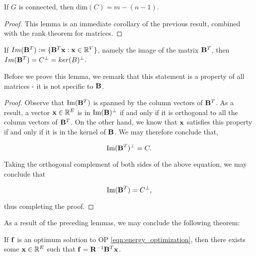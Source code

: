 \documentclass[11pt]{article}
\begin{document}
\begin{lemma}

If $G$ is connected, then $\text{dim}(C)= m -(n-1)$.

\end{lemma}

\begin{proof}

This lemma is an immediate corollary of the previous result, combined with the rank theorem
for matrices.

\end{proof}

\begin{lemma}

If $Im(\V{B}^{T}):=\{ \V{B}^{T}\V{x}: \V{x} \in \rea^{V}\}$, namely the image of the matrix $\V{B}^{T}$,
then $Im(\V{B}^{T})=C^{\perp}=ker(B)^{\perp}$.


\end{lemma}

Before we prove this lemma, we remark that this statement is a property of all matrices - it is not
specific to $\V{B}$.

\begin{proof}


Observe that $\text{Im}(\V{B}^{T})$ is spanned by the column vectors
of $\V{B}^{T}$. As a result, a vector $\V{x} \in \rea^{E}$ is in $\text{Im}(\V{B})^{\perp}$
if and only if it is orthogonal to all the column vectors of $\V{B}^{T}$. On the other hand,
we know that $\V{x}$ satisfies this property if and only if
it is in the kernel of $\V{B}$. We may therefore conclude that,

\[
 	\text{Im}(\V{B}^{T})^{\perp} = C.
\]

Taking the orthogonal complement of both sides of the above equation, we may conclude that

\[
	\text{Im}(\V{B}^{T}) = C^{\perp},
\]

thus completing the proof.


\end{proof}

As a result of the preceding lemmas, we may conclude the following theorem:

\begin{theorem}\label{thm:energy_characterization}

If $\V{f}$ is an optimum solution to OP \ref{eqn:energy_optimization},
then there exists some $\V{x} \in \rea^{E}$ such that $\V{f} = \V{R}^{-1}\V{B}^{T}\V{x}$.


\end{theorem}
\end{document}
